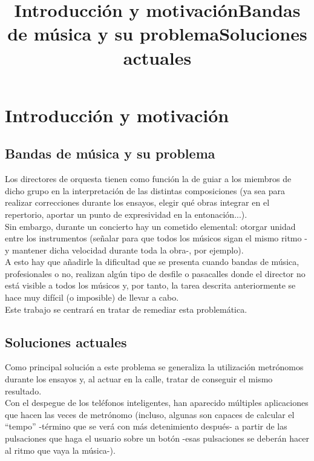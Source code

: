 \chapter{Introducción y motivación}
\title{Introducción y motivación}
\title{Bandas de música y su problema}
\section{Bandas de música y su problema}

Los directores de orquesta tienen como función la de guiar a los miembros de dicho
grupo en la interpretación de las distintas composiciones (ya sea para realizar correcciones
durante los ensayos, elegir qué obras integrar en el repertorio, aportar un punto de expresividad
en la entonación...).\\

Sin embargo, durante un concierto hay un cometido elemental: otorgar unidad entre los instrumentos
(señalar para que todos los músicos sigan el mismo ritmo -y mantener dicha velocidad durante toda la
obra-, por ejemplo).\\

A esto hay que añadirle la dificultad que se presenta cuando bandas de música, profesionales o no,
realizan algún tipo de desfile o pasacalles donde el director no está visible a todos los músicos y,
por tanto, la tarea descrita anteriormente se hace muy difícil (o imposible) de llevar a cabo.\\

Este trabajo se centrará en tratar de remediar esta problemática.


\title{Soluciones actuales}
\section{Soluciones actuales}

Como principal solución a este problema se generaliza la utilización metrónomos durante los ensayos y,
al actuar en la calle, tratar de conseguir el mismo resultado.\\

Con el despegue de los teléfonos inteligentes, han aparecido múltiples aplicaciones que hacen las veces
de metrónomo (incluso, algunas son capaces de calcular el “tempo” -término que se verá con más detenimiento
después- a partir de las pulsaciones que haga el usuario sobre un botón -esas pulsaciones se deberán hacer
al ritmo que vaya la música-).\\

